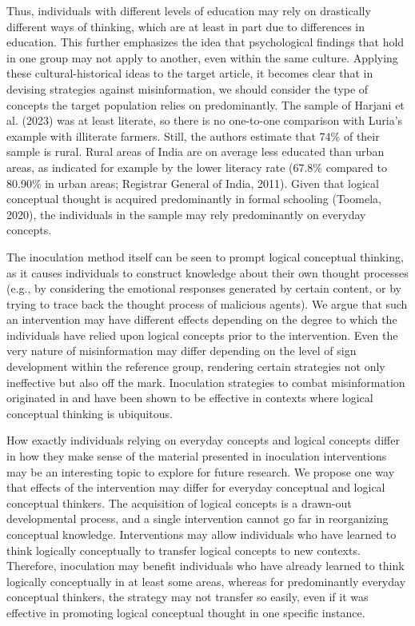 \documentclass[authordate, reflection]{jote-new-article}
\begin{document}
	Thus, individuals with different levels of education may rely on drastically different ways of thinking, which are at least in part due to differences in education. This further emphasizes the idea that psychological findings that hold in one group may not apply to another, even within the same culture. Applying these cultural-historical ideas to the target article, it becomes clear that in devising strategies against misinformation, we should consider the type of concepts the target population relies on predominantly. The sample of Harjani et al. (2023) was at least literate, so there is no one-to-one comparison with Luria's example with illiterate farmers. Still, the authors estimate that 74\% of their sample is rural. Rural areas of India are on average less educated than urban areas, as indicated for example by the lower literacy rate (67.8\% compared to 80.90\% in urban areas; Registrar General of India, 2011). Given that logical conceptual thought is acquired predominantly in formal schooling (Toomela, 2020), the individuals in the sample may rely predominantly on everyday concepts.



	The inoculation method itself can be seen to prompt logical conceptual thinking, as it causes individuals to construct knowledge about their own thought processes (e.g., by considering the emotional responses generated by certain content, or by trying to trace back the thought process of malicious agents). We argue that such an intervention may have different effects depending on the degree to which the individuals have relied upon logical concepts prior to the intervention. Even the very nature of misinformation may differ depending on the level of sign development within the reference group, rendering certain strategies not only ineffective but also off the mark. Inoculation strategies to combat misinformation originated in and have been shown to be effective in contexts where logical conceptual thinking is ubiquitous.



	How exactly individuals relying on everyday concepts and logical concepts differ in how they make sense of the material presented in inoculation interventions may be an interesting topic to explore for future research. We propose one way that effects of the intervention may differ for everyday conceptual and logical conceptual thinkers. The acquisition of logical concepts is a drawn-out developmental process, and a single intervention cannot go far in reorganizing conceptual knowledge. Interventions may allow individuals who have learned to think logically conceptually to transfer logical concepts to new contexts. Therefore, inoculation may benefit individuals who have already learned to think logically conceptually in at least some areas, whereas for predominantly everyday conceptual thinkers, the strategy may not transfer so easily, even if it was effective in promoting logical conceptual thought in one specific instance.
\end{document}
